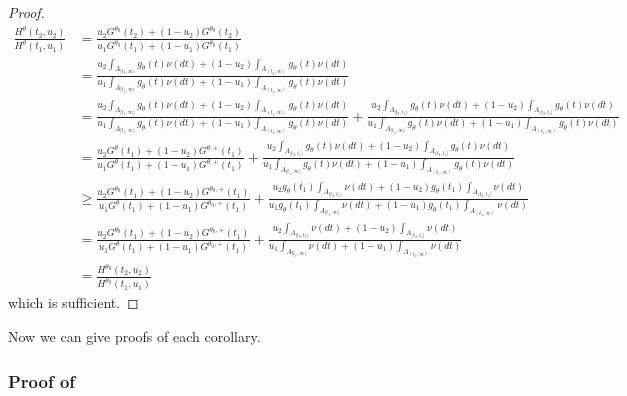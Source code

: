 \documentclass{article}
\begin{document}
\begin{appendix}
\begin{proof}
    \begin{align*}
        \frac{H^{\theta}(t_2, u_2)}{H^{\theta}(t_1, u_1)} &= \frac{u_2G^{\theta_0}(t_2)  + (1-u_2) G^{\theta_0}(t_2)}{u_1 G^{\theta_0}(t_1)  + (1-u_1) G^{\theta_0}(t_1)}\\
        &= \frac{u_2  \int_{A_{[t_2, \infty)}}g_{\theta}(t) \nu(dt)  + (1-u_2) \int_{A_{(t_2, \infty)}} g_{\theta}(t) \nu(dt)}{u_1 \int_{A_{[t_1, \infty)}} g_{\theta}(t) \nu(dt)  + (1-u_1) \int_{A_{(t_1, \infty)}} g_{\theta}(t) \nu(dt)}\\
        &= \frac{u_2  \int_{A_{[t_1, \infty)}}g_{\theta}(t) \nu(dt)  + (1-u_2) \int_{A_{(t_1, \infty)}} g_{\theta}(t) \nu(dt)}{u_1 \int_{A_{[t_1, \infty)}} g_{\theta}(t) \nu(dt)  + (1-u_1) \int_{A_{(t_1, \infty)}} g_{\theta}(t) \nu(dt)} + \frac{u_2  \int_{A_{[t_2, t_1)}}g_{\theta}(t) \nu(dt)  + (1-u_2) \int_{A_{(t_2, t_1]}} g_{\theta}(t) \nu(dt)}{u_1 \int_{A_{[t_1, \infty)}} g_{\theta}(t) \nu(dt)  + (1-u_1) \int_{A_{(t_1, \infty)}} g_{\theta}(t) \nu(dt)}\\
        &= \frac{u_2G^{\theta}(t_1)  + (1-u_2) G^{\theta, +}(t_1)}{u_1 G^{\theta}(t_1)  + (1-u_1) G^{\theta, +}(t_1)} + \frac{u_2  \int_{A_{[t_2, t_1)}}g_{\theta}(t) \nu(dt)  + (1-u_2) \int_{A_{(t_2, t_1]}} g_{\theta}(t) \nu(dt)}{u_1 \int_{A_{[t_1, \infty)}} g_{\theta}(t) \nu(dt)  + (1-u_1) \int_{A_{(t_1, \infty)}} g_{\theta}(t) \nu(dt)}\\
        &\geq \frac{u_2G^{\theta_0}(t_1)  + (1-u_2) G^{\theta_0, +}(t_1)}{u_1 G^{\theta}(t_1)  + (1-u_1) G^{\theta_0, +}(t_1)} + \frac{u_2 g_{\theta}(t_1) \int_{A_{[t_2, t_1)}} \nu(dt)  + (1-u_2) g_{\theta}(t_1)  \int_{A_{(t_2, t_1]}}  \nu(dt)}{u_1 g_{\theta}(t_1) \int_{A_{[t_1, \infty)}}  \nu(dt)  + (1-u_1) g_{\theta}(t_1) \int_{A_{(t_1, \infty)}} \nu(dt)}\\
        &= \frac{u_2G^{\theta_0}(t_1)  + (1-u_2) G^{\theta_0, +}(t_1)}{u_1 G^{\theta}(t_1)  + (1-u_1) G^{\theta_0, +}(t_1)} + \frac{u_2 \int_{A_{[t_2, t_1)}} \nu(dt)  + (1-u_2)   \int_{A_{(t_2, t_1]}}  \nu(dt)}{u_1  \int_{A_{[t_1, \infty)}}  \nu(dt)  + (1-u_1) \int_{A_{(t_1, \infty)}} \nu(dt)}\\
        &= \frac{H^{\theta_0}(t_2, u_2)}{H^{\theta_0}(t_1, u_1)}
    \end{align*}
    which is sufficient. 

\end{proof}

Now we can give proofs of each corollary. 

\subsubsection{Proof of }


\end{appendix}
\end{document}
